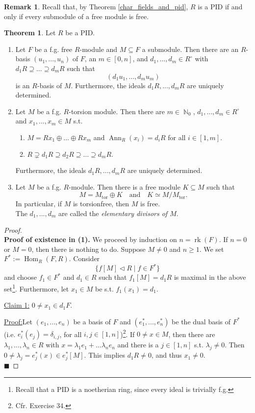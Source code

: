 \documentclass[12pt,a4paper]{report}
\theoremstyle{definition}
\newtheorem{theorem}{Theorem}[chapter] %
\newtheorem*{remark}{Remark}
\theoremstyle{num.custom-title}
\newenvironment{claim}[1]{\par\noindent\underline{Claim#1:}\space}{} %
\newenvironment{claimproof}[1]{\par\noindent\underline{Proof:}\space#1}{\leavevmode\unskip\penalty9999 \hbox{}\nobreak\hfill\quad\hbox{$\blacksquare$}} %
\DeclareMathOperator{\rk}{rk}
\DeclareMathOperator{\tor}{tor}
\DeclareMathOperator{\Hom}{Hom}
\DeclareMathOperator{\Ann}{Ann}
\DeclareMathOperator{\N}{\mathbb{N}}
\DeclareMathOperator{\sse}{\subseteq}
\begin{document}
\begin{remark}
Recall that, by Theorem \ref{char_fields_and_pid}, $R$ is a PID if and only if every submodule of a free module is free.
\end{remark}

\begin{theorem}\label{thm_modules_over_PID}
Let $R$ be a PID.
\begin{enumerate}
\item Let $F$ be a f.g. free $R$-module and $M \sse F$ a submodule. Then there are an $R$-basis $(u_1,...,u_n)$ of $F$, an $m \in [0,n]$, and $d_1,...,d_m \in R^\circ$ with $d_1 R \supseteq \ldots \supseteq d_m R$ such that
\[
(d_1 u_1, \ldots, d_m u_m)
\]
is an $R$-basis of $M$. Furthermore, the ideals $d_1 R,...,d_m R$ are uniquely determined.
\item Let $M$ be a f.g. $R$-torsion module. Then there are $m \in \N_0$, $d_1,...,d_m \in R^\circ$ and $x_1,...,x_m \in M$ s.t.
\begin{enumerate}
\item $M = R x_1 \oplus \ldots \oplus R x_m$ and $\Ann_R(x_i) = d_i R$ for all $i \in [1,m]$.
\item $R \supsetneq d_1 R \supseteq d_2 R \supseteq \ldots \supseteq d_m R$.
\end{enumerate}
Furthermore, the ideals $d_1 R,...,d_m R$ are uniquely determined.
\item Let $M$ be a f.g. $R$-module. Then there is a free module $K \sse M$ such that 
\[
M = M_{\tor} \oplus K \quad \text{and} \quad K \simeq M/M_{\tor}.
\]
In particular, if $M$ is torsionfree, then $M$ is free.\\
The $d_1,...,d_m$ are called the \emph{elementary divisors of $M$}.
\end{enumerate}
\begin{proof}\ \\
\textbf{Proof of existence in (1).} We proceed by induction on $n = \rk(F)$. If $n=0$ or $M=0$, then there is nothing to do. Suppose $M \neq 0$ and $n \geq 1$. We set $F^* := \Hom_R(F,R)$. Consider
\[
\{f[M] \lhd R \mid f \in F^*\}
\]
and choose $f_1 \in F^*$ and $d_1 \in R$ such that $f_1[M] = d_1 R$ is maximal in the above set\footnote{Recall that a PID is a noetherian ring, since every ideal is trivially f.g.}. Furthermore, let $x_1 \in M$ be s.t. $f_1(x_1)=d_1$.
\begin{claim}{ 1}
$0 \neq x_1 \in d_1 F$.
\begin{claimproof}
Let $(e_1,...,e_n)$ be a basis of $F$ and $(e_1^*,...,e_n^*)$ be the dual basis of $F^*$ (i.e. $e_i^*(e_j)=\delta_{i,j}$, for all $i,j \in [1,n]$)\footnote{Cfr. Exercise 34.}. If $0 \neq x \in M$, then there are $\lambda_1,...,\lambda_n \in R$ with $x=\lambda_1 e_1 + \ldots \lambda_n e_n$ and there is a $j \in [1,n]$ s.t. $\lambda_j \neq 0$. Then $0 \neq \lambda_j = e_j^*(x) \in e_j^*[M]$. This implies $d_1 R \neq 0$, and thus $x_1 \neq 0$.\\

\end{claimproof}
\end{claim}
\end{proof}
\end{theorem}
\end{document}
